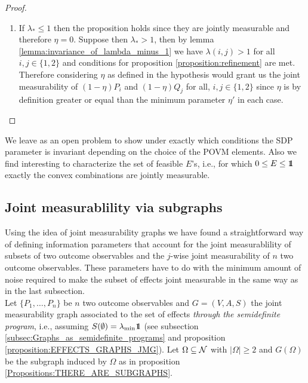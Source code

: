 \documentclass[10pt, a4paper]{amsart}
\begin{document}
\begin{proof}
\begin{enumerate}
\item If $\lambda_{*}\leq 1$ then the proposition holds since they are jointly measurable and therefore $\eta = 0$. 
Suppose then $\lambda_{*}>1$, then by  lemma  \ref{lemma:invariance_of_lambda_minus_1} we  have $\lambda (i,j) > 1$ for all $i,j\in \{1,2\}$ and conditions for proposition \ref{proposition:refinement} are met. Therefore considering $\eta$ as defined in the hypothesis would grant us the joint measurability of $(1-\eta ) P_{i}$ and $(1-\eta) Q_{j}$ for all, $i,j\in \{1,2\}$ since $\eta$ is by definition greater or equal than the minimum parameter $\eta'$ in each case.  
\end{enumerate}

\end{proof}







We leave as an open problem to show under exactly which conditions the SDP parameter is invariant depending on the choice of the POVM elements. Also we find interesting to characterize the set of feasible $E$'s, i.e., for which $0\leq E\leq \bbone$ exactly the convex combinations are jointly measurable.  
















\newpage
\subsection{Joint measurablility via subgraphs}

Using the idea of joint measurability graphs we have found a straightforward way of defining information parameters that account 
for the joint measurablility of subsets of two outcome observables and the $j$-wise joint measurability of $n$ two outcome observables. These parameters have to do with the minimum amount of noise required to make the subset 
of effects joint measurable in the same way as in the last subsection. \\

Let $\{P_{1}, \ldots, P_{n}\}$ be $n$  two outcome observables and $G = (V,A,S) $ the joint measurability graph associated to the set of effects \textit{through the semidefinite program}, i.e., assuming $S(\emptyset ) = \lambda_{\mathrm{min}}\bbone$ (see subsection \ref{subsec:Graphs_as_semidefinite_programs} and proposition \ref{proposition:EFFECTS_GRAPHS_JMG}). Let $\Omega \subseteq \mathcal{N} $ with $|\Omega|\geq 2$ and $G(\Omega )$ be the subgraph induced by $\Omega $ as in proposition  \ref{Propositions:THERE_ARE_SUBGRAPHS}. \\
\end{document}
